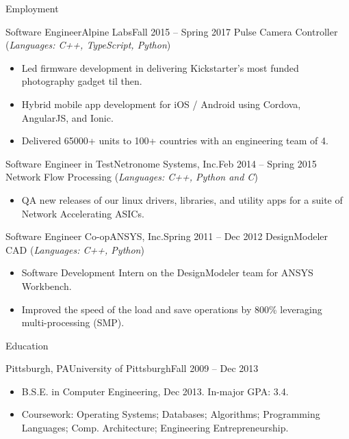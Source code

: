 \documentclass[]{mussocv}
\begin{document}
\begin{cvsection}{Employment}
		\begin{cvsubsection}{Software Engineer}{Alpine Labs}{Fall 2015 -- Spring 2017}
			Pulse Camera Controller	(\textit{Languages: C++, TypeScript, Python})
			\begin{itemize}
				\item Led firmware development in delivering Kickstarter's most funded photography gadget til then.
				\item Hybrid mobile app development for iOS / Android using Cordova, AngularJS, and Ionic.
				\item Delivered 65000+ units to 100+ countries with an engineering team of 4.
			\end{itemize}
		\end{cvsubsection}

		\begin{cvsubsection}{Software Engineer in Test}{Netronome Systems, Inc.}{Feb 2014 -- Spring 2015}
			Network Flow Processing (\textit{Languages: C++, Python and C})
			\begin{itemize}
				\item QA new releases of our linux drivers, libraries, and utility apps for a suite of Network Accelerating ASICs.
			\end{itemize}
		\end{cvsubsection}

		\begin{cvsubsection}{Software Engineer Co-op}{ANSYS, Inc.}{Spring 2011 -- Dec 2012}
			DesignModeler CAD (\textit{Languages: C++, Python})
			\begin{itemize}
				\item Software Development Intern on the DesignModeler team for ANSYS Workbench. 
				\item Improved the speed of the load and save operations by 800\% leveraging multi-processing (SMP).
			\end{itemize}
		\end{cvsubsection}
	\end{cvsection}
	
	\begin{cvsection}{Education}
		\begin{cvsubsection}{Pittsburgh, PA}{University of Pittsburgh}{Fall 2009 -- Dec 2013}
			\begin{itemize}
				\item B.S.E. in Computer Engineering, Dec 2013.  In-major GPA: 3.4.
				\item Coursework: Operating Systems; Databases; Algorithms; Programming Languages; Comp. Architecture; Engineering Entrepreneurship.
			\end{itemize}
		\end{cvsubsection}
	\end{cvsection}
	
\end{document}
